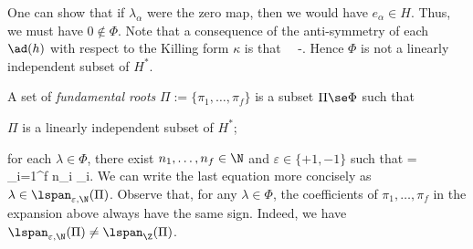 One can show that if $\lambda_\alpha$ were the zero map, then we would have $e_\alpha\in H$. Thus, we must have $0\notin \Phi$. Note that a consequence of the anti-symmetry of each $\ad(h)$ with respect to the Killing form $\kappa$ is that
\bse
\lambda \in \Phi\ \Rightarrow\ -\lambda\in \Phi.
\ese
Hence $\Phi$ is not a linearly independent subset of $H^*$.

\bd
A set of \emph{fundamental roots} $\Pi:=\{\pi_1,\ldots,\pi_f\}$ is a subset $\Pi\se\Phi$ such that 
\ben[label=\alph*)]
\item $\Pi$ is a linearly independent subset of $H^*$;
\item for each $\lambda \in \Phi$, there exist $n_1,\ldots,n_f\in \N$ and $\varepsilon \in \{+1,-1\}$ such that
\bse
\lambda = \varepsilon \, \sum_{i=1}^f n_i \pi_i.
\ese
\een
\ed
We can write the last equation more concisely as $\lambda \in \lspan_{\varepsilon,\N}(\Pi)$. Observe that, for any $\lambda\in \Phi$, the coefficients of $\pi_1,\ldots,\pi_f$ in the expansion above always have the same sign. Indeed, we have $\lspan_{\varepsilon,\N}(\Pi)\neq \lspan_{\Z}(\Pi)$. 

